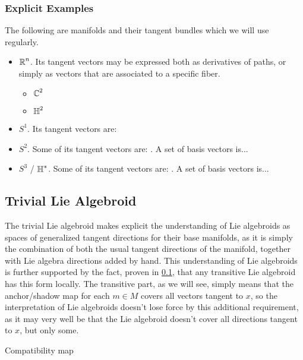 
\subsubsection{Explicit Examples}

The following are manifolds and their tangent bundles which we will use regularly.

    \begin{itemize}
    \item $\operatorname{\mathbb{R}}^n$. Its tangent vectors may be expressed both as derivatives of paths, or simply as vectors that are associated to a specific fiber.
        \begin{itemize}
        \item $\operatorname{\mathbb{C}}^2$
        \item $\operatorname{\mathbb{H}}^2$
        \end{itemize}
    \item $S^1$. Its tangent vectors are:
    \item $S^2$. Some of its tangent vectors are: . A set of basis vectors is...
    \item $S^3$ / $\operatorname{\mathbb{H}}^*$. Some of its tangent vectors are: . A set of basis vectors is...
    \end{itemize}

\subsection{Trivial Lie Algebroid}

The trivial Lie algebroid makes explicit the understanding of Lie algebroids as spaces of generalized tangent directions for their base manifolds, as it is simply the combination of both the usual tangent directions of the manifold, together with Lie algebra directions added by hand. This understanding of Lie algebroids is further supported by the fact, proven in \ref{}, that any transitive Lie algebroid has this form locally. The transitive part, as we will see, simply means that the anchor/shadow map for each $m \in M$ covers all vectors tangent to $x$, so the interpretation of Lie algebroids doesn't lose force by this additional requirement, as it may very well be that the Lie algebroid doesn't cover all directions tangent to $x$, but only some.

Compatibility map

